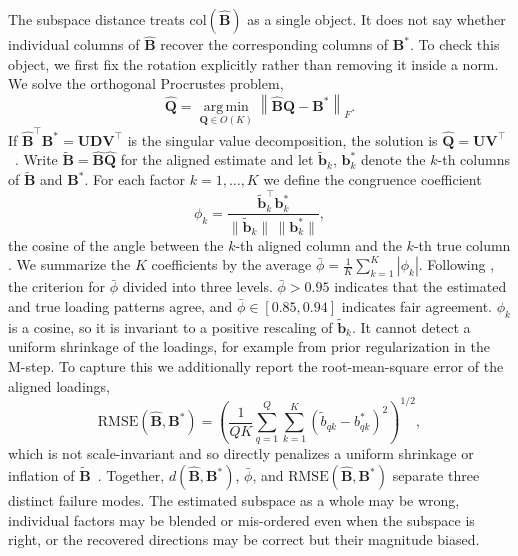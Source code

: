 The subspace distance treats $\mathrm{col}(\hat{\mathbf{B}})$ as a single object. It does not say whether individual columns of $\hat{\mathbf{B}}$ recover the corresponding columns of $\mathbf{B}^{*}$. To check this object, we first fix the rotation explicitly rather than removing it inside a norm. We solve the orthogonal Procrustes problem,
\begin{equation}
    \hat{\mathbf{Q}} = \operatorname*{arg\,min}_{\mathbf{Q}\in O(K)} \left\| \hat{\mathbf{B}}\mathbf{Q} - \mathbf{B}^{*} \right\|_F.
    \label{eq:ortho-procruste-problem}
\end{equation}
If $\hat{\mathbf{B}}^\top \mathbf{B}^{*} = \mathbf{U}\mathbf{D}\mathbf{V}^\top$ is the singular value decomposition, the solution is $\hat{\mathbf{Q}} = \mathbf{U}\mathbf{V}^\top$~\citep{Schonemann1966}. Write $\tilde{\mathbf{B}} = \hat{\mathbf{B}}\hat{\mathbf{Q}}$ for the aligned estimate and let $\tilde{\mathbf{b}}_k$, $\mathbf{b}_k^{*}$ denote the $k$-th columns of $\tilde{\mathbf{B}}$ and $\mathbf{B}^{*}$. For each factor $k = 1,\dots,K$ we define the congruence coefficient
\begin{equation}
    \phi_k = \frac{\tilde{\mathbf{b}}_k^\top \mathbf{b}_k^{*}}{\|\tilde{\mathbf{b}}_k\| \, \|\mathbf{b}_k^{*}\|},
    \label{eq:phi}
\end{equation}
the cosine of the angle between the $k$-th aligned column and the $k$-th true column \citep{Tucker1951, Berge1977, Lorenzo2006}. We summarize the $K$ coefficients by the average $\bar\phi = \frac{1}{K}\sum_{k=1}^K |\phi_k|$. Following \citet{Berge1977, Lorenzo2006}, the criterion for $\bar{\phi}$ divided into three levels. $\bar\phi > 0.95$ indicates that the estimated and true loading patterns agree, and $\bar\phi \in [0.85, 0.94]$ indicates fair agreement. $\phi_k$ is a cosine, so it is invariant to a positive rescaling of $\tilde{\mathbf{b}}_k$. It cannot detect a uniform shrinkage of the loadings, for example from prior regularization in the M-step. To capture this we additionally report the root-mean-square error of the aligned loadings,
\begin{equation}
    \mathrm{RMSE}(\hat{\mathbf{B}}, \mathbf{B}^{*}) = \left(\frac{1}{QK}\sum_{q=1}^Q\sum_{k=1}^K \left(\tilde{b}_{qk}-b^{*}_{qk}\right)^2\right)^{1/2},
    \label{eq:rmse}
\end{equation}
which is not scale-invariant and so directly penalizes a uniform shrinkage or inflation of $\tilde{\mathbf{B}}$~\citep{MacCallum1999}. Together, $d(\hat{\mathbf{B}}, \mathbf{B}^{*})$, $\bar\phi$, and $\mathrm{RMSE}(\hat{\mathbf{B}}, \mathbf{B}^{*})$ separate three distinct failure modes. The estimated subspace as a whole may be wrong, individual factors may be blended or mis-ordered even when the subspace is right, or the recovered directions may be correct but their magnitude biased.

